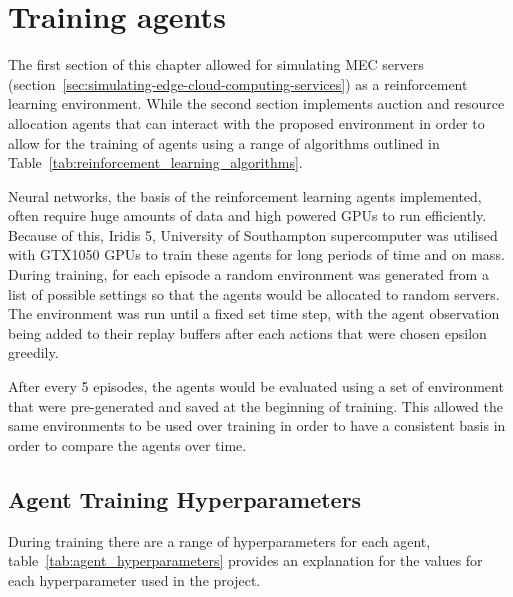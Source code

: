 \section{Training agents}\label{sec:training-agents}
The first section of this chapter allowed for simulating MEC servers
(section~\ref{sec:simulating-edge-cloud-computing-services}) as a reinforcement learning environment. While the second
section implements auction and resource allocation agents that can interact with the proposed environment in order
to allow for the training of agents using a range of algorithms outlined in Table~\ref{tab:reinforcement_learning_algorithms}.

Neural networks, the basis of the reinforcement learning agents implemented, often require huge amounts of data and
high powered GPUs to run efficiently. Because of this, Iridis 5, University of Southampton supercomputer was utilised with
GTX1050 GPUs to train these agents for long periods of time and on mass. During training, for each episode a random
environment was generated from a list of possible settings so that the agents would be allocated to random servers. The
environment was run until a fixed set time step, with the agent observation being added to their replay buffers after each actions
that were chosen epsilon greedily.

After every 5 episodes, the agents would be evaluated using a set of environment that were pre-generated and
saved at the beginning of training. This allowed the same environments to be used over training in order to have a
consistent basis in order to compare the agents over time.

\subsection{Agent Training Hyperparameters}\label{subsec:agent-training-hyperparameters}
During training there are a range of hyperparameters for each agent, table~\ref{tab:agent_hyperparameters} provides
an explanation for the values for each hyperparameter used in the project.

